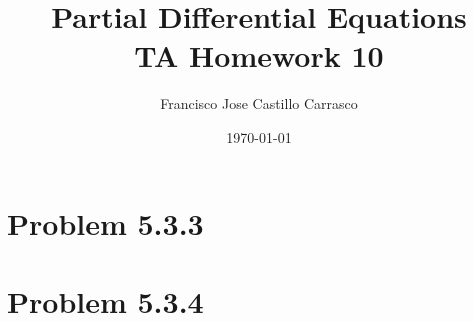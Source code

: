 




\title{Partial Differential Equations\\TA Homework 10}
\author{Francisco Jose Castillo Carrasco}
\date{\today}
\maketitle




\section*{Problem 5.3.3}

\newpage
\section*{Problem 5.3.4}


